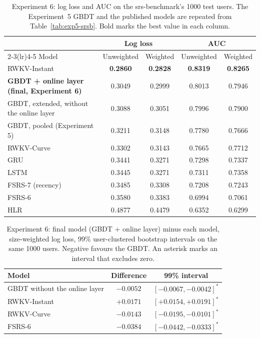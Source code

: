 \begin{table}[htbp]
  \centering
  \caption[Experiment 6: srs-benchmark test]{Experiment 6: log loss and AUC on the srs-benchmark's 1000 test users. The
    Experiment~5 GBDT and the published models are repeated from Table~\ref{tab:exp5-srsb}. Bold marks the best value in each column.}
  \label{tab:exp6-test}
  \begin{tabular}{@{}lcccc@{}}
    \toprule
    & \multicolumn{2}{c}{Log loss} & \multicolumn{2}{c}{AUC} \\
    \cmidrule(lr){2-3}\cmidrule(lr){4-5}
    Model & Unweighted & Weighted & Unweighted & Weighted \\
    \midrule
    RWKV-Instant & \textbf{0.2860} & \textbf{0.2828} & \textbf{0.8319} & \textbf{0.8265} \\
    \textbf{GBDT + online layer (final, Experiment 6)} & 0.3049 & 0.2999 & 0.8013 & 0.7946 \\
    GBDT, extended, without the online layer & 0.3088 & 0.3051 & 0.7996 & 0.7900 \\
    GBDT, pooled (Experiment 5) & 0.3211 & 0.3148 & 0.7780 & 0.7666 \\
    RWKV-Curve & 0.3302 & 0.3143 & 0.7665 & 0.7712 \\
    GRU & 0.3441 & 0.3271 & 0.7298 & 0.7337 \\
    LSTM & 0.3445 & 0.3271 & 0.7311 & 0.7358 \\
    FSRS-7 (recency) & 0.3485 & 0.3308 & 0.7208 & 0.7243 \\
    FSRS-6 & 0.3580 & 0.3383 & 0.6994 & 0.7061 \\
    HLR & 0.4877 & 0.4479 & 0.6352 & 0.6299 \\
    \bottomrule
  \end{tabular}
\end{table}

\begin{table}[htbp]
  \centering
  \caption[Experiment 6: paired differences]{Experiment 6: final model (GBDT + online layer) minus each model, size-weighted log loss, 99\% user-clustered
    bootstrap intervals on the same 1000 users. Negative favours the GBDT. An asterisk marks an interval that excludes zero.}
  \label{tab:exp6-paired}
  \begin{tabular}{@{}lcc@{}}
    \toprule
    Model & Difference & 99\% interval \\
    \midrule
    GBDT without the online layer & $-0.0052$ & $[-0.0067, -0.0042]^{*}$ \\
    RWKV-Instant & $+0.0171$ & $[+0.0154, +0.0191]^{*}$ \\
    RWKV-Curve & $-0.0143$ & $[-0.0195, -0.0101]^{*}$ \\
    FSRS-6 & $-0.0384$ & $[-0.0442, -0.0333]^{*}$ \\
    \bottomrule
  \end{tabular}
\end{table}

